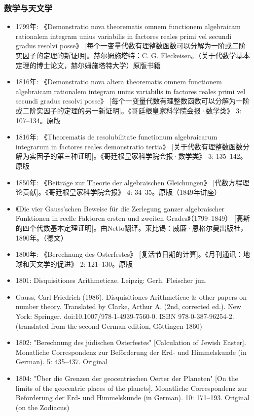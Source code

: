 \subsubsection{数学与天文学}
\begin{itemize}
\item 1799年: 《Demonstratio nova theorematis omnem functionem algebraicam rationalem integram unius variabilis in factores reales primi vel secundi gradus resolvi posse》 [每个一变量代数有理整数函数可以分解为一阶或二阶实因子的定理的新证明]。赫尔姆施塔特：C. G. Fleckeisen。（关于代数学基本定理的博士论文，赫尔姆施塔特大学）原版书籍  
\item 1816年: 《Demonstratio nova altera theorematis omnem functionem algebraicam rationalem integram unius variabilis in factores reales primi vel secundi gradus resolvi posse》 [每个一变量代数有理整数函数可以分解为一阶或二阶实因子的定理的另一新证明]。《哥廷根皇家科学院会报·数学类》 3: 107–134。原版  
\item 1816年: 《Theorematis de resolubilitate functionum algebraicarum integrarum in factores reales demonstratio tertia》 [关于代数有理整数函数分解为实因子的第三种证明]。《哥廷根皇家科学院会报·数学类》 3: 135–142。原版  
\item 1850年: 《Beiträge zur Theorie der algebraischen Gleichungen》 [代数方程理论贡献]。《哥廷根皇家科学院会报》 4: 34–35。原版（1849年讲座）  
\item 《Die vier Gauss'schen Beweise für die Zerlegung ganzer algebraischer Funktionen in reelle Faktoren ersten und zweiten Grades》（1799–1849） [高斯的四个代数基本定理证明]。由Netto翻译。莱比锡：威廉·恩格尔曼出版社，1890年。（德文）  
\item 1800年: 《Berechnung des Osterfestes》 [复活节日期的计算]。《月刊通讯：地球和天文学的促进》 2: 121–130。原版
\item 1801: Disquisitiones Arithmeticae. Leipzig: Gerh. Fleischer jun.
\item Gauss, Carl Friedrich (1986). Disquisitiones Arithmeticae & other papers on number theory. Translated by Clarke, Arthur A. (2nd, corrected ed.). New York: Springer. doi:10.1007/978-1-4939-7560-0. ISBN 978-0-387-96254-2. (translated from the second German edition, Göttingen 1860)
\item 1802: "Berechnung des jüdischen Osterfestes" [Calculation of Jewish Easter]. Monatliche Correspondenz zur Beförderung der Erd- und Himmelskunde (in German). 5: 435–437. Original
\item 1804: "Über die Grenzen der geocentrischen Oerter der Planeten" [On the limits of the geocentric places of the planets]. Monatliche Correspondenz zur Beförderung der Erd- und Himmelskunde (in German). 10: 171–193. Original (on the Zodiacus)

\end{itemize}
